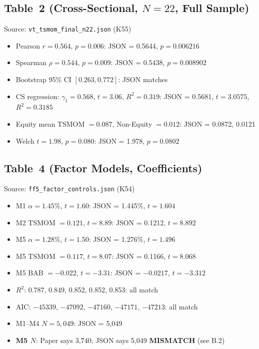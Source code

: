 \documentclass[12pt,a4paper]{article}
\begin{document}
\subsection{Table~2 (Cross-Sectional, $N = 22$, Full Sample)}

Source: \texttt{vt\_tsmom\_final\_n22.json} (K55)

\begin{itemize}
    \item Pearson $r = 0.564$, $p = 0.006$: JSON = 0.5644, $p = 0.006216$ \checkmark
    \item Spearman $\rho = 0.544$, $p = 0.009$: JSON = 0.5438, $p = 0.008902$ \checkmark
    \item Bootstrap 95\% CI $[0.263, 0.772]$: JSON matches \checkmark
    \item CS regression: $\gamma_1 = 0.568$, $t = 3.06$, $R^2 = 0.319$: JSON = 0.5681, $t = 3.0575$, $R^2 = 0.3185$ \checkmark
    \item Equity mean TSMOM $= 0.087$, Non-Equity $= 0.012$: JSON = 0.0872, 0.0121 \checkmark
    \item Welch $t = 1.98$, $p = 0.080$: JSON = 1.978, $p = 0.0802$ \checkmark
\end{itemize}

\subsection{Table~4 (Factor Models, Coefficients)}

Source: \texttt{ff5\_factor\_controls.json} (K54)

\begin{itemize}
    \item M1 $\alpha = 1.45\%$, $t = 1.60$: JSON = 1.445\%, $t = 1.604$ \checkmark
    \item M2 TSMOM $= 0.121$, $t = 8.89$: JSON = 0.1212, $t = 8.892$ \checkmark
    \item M5 $\alpha = 1.28\%$, $t = 1.50$: JSON = 1.276\%, $t = 1.496$ \checkmark
    \item M5 TSMOM $= 0.117$, $t = 8.07$: JSON = 0.1166, $t = 8.068$ \checkmark
    \item M5 BAB $= -0.022$, $t = -3.31$: JSON = $-0.0217$, $t = -3.312$ \checkmark
    \item $R^2$: 0.787, 0.849, 0.852, 0.852, 0.853: all match \checkmark
    \item AIC: $-45339$, $-47092$, $-47160$, $-47171$, $-47213$: all match \checkmark
    \item M1--M4 $N = 5{,}049$: JSON = 5,049 \checkmark
    \item \textbf{M5 $N$}: Paper says 3,740; JSON says 5,049 \textbf{MISMATCH} (see B.2)
\end{itemize}
\end{document}
